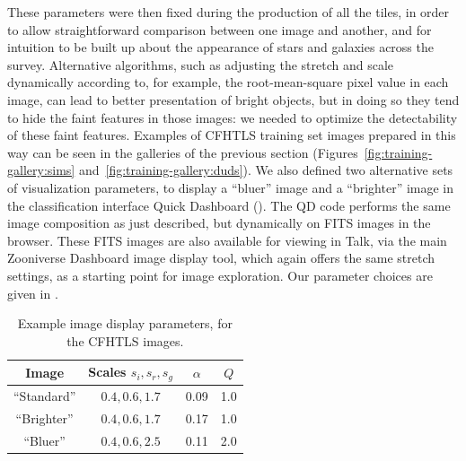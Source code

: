 \documentclass[useAMS,usenatbib,a4paper]{mn2e}
\begin{document}
These parameters were then fixed during the production of all the tiles, in
order to allow straightforward comparison between one image and another, and
for intuition to be built up about the appearance of stars and galaxies across
the survey. Alternative algorithms, such as adjusting the stretch and scale
dynamically according to, for example, the root-mean-square pixel value in
each image, can lead to better presentation of bright objects, but in doing so
they tend to hide the faint features in those images: we needed to optimize
the detectability of these faint features.   Examples of CFHTLS training set
images prepared in this way can be seen in the galleries of the previous
section (Figures~\ref{fig:training-gallery:sims}
and~\ref{fig:training-gallery:duds}). We also defined two alternative sets of
visualization parameters, to display a ``bluer'' image and a ``brighter''
image in the classification interface Quick Dashboard
(). The QD code performs the same image composition
as just described, but dynamically on FITS images in the browser. These FITS
images are also available for viewing in Talk, via the main Zooniverse
Dashboard image display tool, which again offers the same stretch settings, as
a starting point for image exploration. Our parameter choices are given in
.

\begin{table}
\begin{center}
\caption{Example \humvi image display parameters, for the CFHTLS images.}
\label{tab:data:humvi}
\begin{tabular}{cccc}
  \hline
  \hline {Image} & Scales ${s_i,s_r,s_g}$ & $\alpha$ & $Q$ \\
  \hline
    ``Standard'' &    ${0.4,0.6,1.7}$     &   0.09   & 1.0 \\
    ``Brighter'' &    ${0.4,0.6,1.7}$     &   0.17   & 1.0 \\
       ``Bluer'' &    ${0.4,0.6,2.5}$     &   0.11   & 2.0 \\
  \hline \hline
\end{tabular}
\medskip\\
\end{center}
\end{table}

\end{document}
